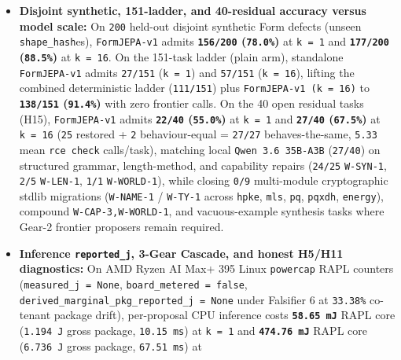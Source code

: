 \documentclass[10pt,letterpaper]{article}
\providecommand{\tightlist}{\setlength{\itemsep}{1pt}\setlength{\parskip}{0pt}}
\begin{document}
\begin{itemize}
\tightlist
\item
  \textbf{Disjoint synthetic, 151-ladder, and 40-residual accuracy
  versus model scale:} On \texttt{200} held-out disjoint synthetic Form
  defects (unseen \texttt{shape\_\allowbreak{}hash}es), \texttt{FormJEPA-\allowbreak{}v1} admits
  \textbf{\texttt{156/200} (\texttt{78.0\%})} at \texttt{k\ =\ 1} and
  \textbf{\texttt{177/200} (\texttt{88.5\%})} at \texttt{k\ =\ 16}. On
  the 151-task ladder (plain arm), standalone \texttt{FormJEPA-\allowbreak{}v1}
  admits \texttt{27/151} (\texttt{k\ =\ 1}) and \texttt{57/151}
  (\texttt{k\ =\ 16}), lifting the combined deterministic ladder
  (\texttt{111/151}) plus \texttt{FormJEPA-\allowbreak{}v1\ (\allowbreak{}k\ =\ 16)} to
  \textbf{\texttt{138/151} (\texttt{91.4\%})} with zero frontier calls.
  On the 40 open residual tasks (H15), \texttt{FormJEPA-\allowbreak{}v1} admits
  \textbf{\texttt{22/40} (\texttt{55.0\%})} at \texttt{k\ =\ 1} and
  \textbf{\texttt{27/40} (\texttt{67.5\%})} at \texttt{k\ =\ 16}
  (\texttt{25} restored + \texttt{2} behaviour-equal = \texttt{27/27}
  behaves-the-same, \texttt{5.33} mean \texttt{rce\ check} calls/task),
  matching local \texttt{Qwen\ 3.\allowbreak{}6\ 35B-\allowbreak{}A3B} (\texttt{27/40}) on
  structured grammar, length-method, and capability repairs
  (\texttt{24/25} \texttt{W-SYN-1}, \texttt{2/5} \texttt{W-LEN-1},
  \texttt{1/1} \texttt{W-WORLD-1}), while closing \texttt{0/9}
  multi-module cryptographic stdlib migrations (\texttt{W-NAME-1} /
  \texttt{W-TY-1} across \texttt{hpke}, \texttt{mls}, \texttt{pq},
  \texttt{pqxdh}, \texttt{energy}), compound \texttt{W-\allowbreak{}CAP-\allowbreak{}3,\allowbreak{}W-\allowbreak{}WORLD-\allowbreak{}1},
  and vacuous-example synthesis tasks where Gear-2 frontier proposers
  remain required.
\item
  \textbf{Inference \texttt{reported\_\allowbreak{}j}, 3-Gear Cascade, and honest
  H5/H11 diagnostics:} On AMD Ryzen AI Max+ 395 Linux \texttt{powercap}
  RAPL counters (\texttt{measured\_\allowbreak{}j\ =\ None},
  \texttt{board\_\allowbreak{}metered\ =\ false},
  \texttt{derived\_\allowbreak{}marginal\_\allowbreak{}pkg\_\allowbreak{}reported\_\allowbreak{}j\ =\ None} under Falsifier
  6 at \texttt{33.38\%} co-tenant package drift), per-proposal CPU
  inference costs \textbf{\texttt{58.65\ mJ}} RAPL core
  (\texttt{1.194\ J} gross package, \texttt{10.15\ ms}) at
  \texttt{k\ =\ 1} and \textbf{\texttt{474.\allowbreak{}76\ mJ}} RAPL core
  (\texttt{6.736\ J} gross package, \texttt{67.51\ ms}) at

\end{itemize}
\end{document}

